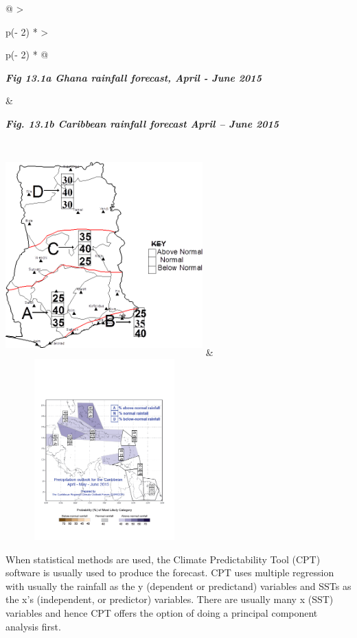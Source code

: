 \documentclass[
  letterpaper,
  DIV=11,
  numbers=noendperiod]{scrreprt}
\begin{document}
\begin{longtable}[]{@{}
  >{\raggedright\arraybackslash}p{(\columnwidth - 2\tabcolsep) * }
  >{\raggedright\arraybackslash}p{(\columnwidth - 2\tabcolsep) * }@{}}
\toprule\noalign{}
\begin{minipage}[b]{\linewidth}\raggedright
\textbf{\emph{Fig 13.1a Ghana rainfall forecast, April - June 2015}}
\end{minipage} & \begin{minipage}[b]{\linewidth}\raggedright
\textbf{\emph{Fig. 13.1b Caribbean rainfall forecast April -- June
2015}}
\end{minipage} \\
\midrule\noalign{}
\endhead
\bottomrule\noalign{}
\endlastfoot
\includegraphics[width=2.99164in,height=3.06824in]{figures/Fig13.1a.png}
&
\includegraphics[width=3.00854in,height=2.74794in]{figures/Fig13.1b.png} \\
\end{longtable}

When statistical methods are used, the Climate Predictability Tool (CPT)
software is usually used to produce the forecast. CPT uses multiple
regression with usually the rainfall as the y (dependent or predictand)
variables and SSTs as the x's (independent, or predictor) variables.
There are usually many x (SST) variables and hence CPT offers the option
of doing a principal component analysis first.
\end{document}
